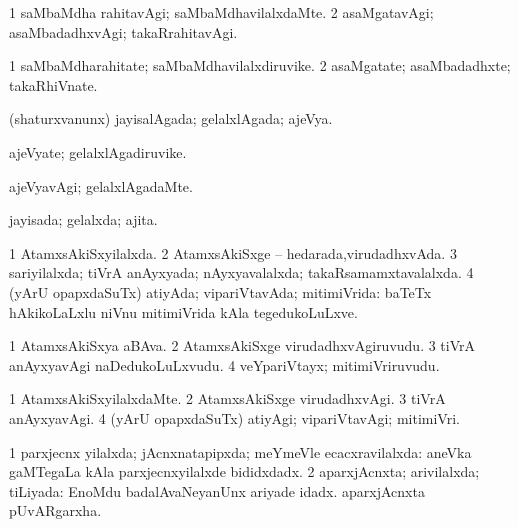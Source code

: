 \bentry
{} 
\gl{\kirxvi}
\expl{}
\bmng
\bnum
\num{1} saMbaMdha rahitavAgi; saMbaMdhavilalxdaMte. 
\num{2} asaMgatavAgi; asaMbadadhxvAgi; takaRrahitavAgi. 
\enum
\emng
\eentry


\bentry
{} 
\gl{\nA}
\expl{}
\bmng
\bnum
\num{1} saMbaMdharahitate; saMbaMdhavilalxdiruvike. 
\num{2} asaMgatate; asaMbadadhxte; takaRhiVnate. 
\enum
\emng
\eentry

\bentry
{} 
\gl{\gu}
\expl{}
\bmng
 (shaturxvanunx) jayisalAgada; gelalxlAgada; ajeVya. 
\emng
\eentry

\bentry
{} 
\gl{\nA}
\expl{}
\bmng
 ajeVyate; gelalxlAgadiruvike. 
\emng
\eentry

\bentry
{} 
\gl{\kirxvi}
\expl{}
\bmng
 ajeVyavAgi; gelalxlAgadaMte. 
\emng
\eentry

\bentry
{} 
\gl{\gu}
\expl{}
\bmng
 jayisada; gelalxda; ajita. 
\emng
\eentry

\bentry
{} 
\gl{\gu}
\expl{}
\bmng
\bnum
\num{1} AtamxsAkiSxyilalxda. 
\num{2} AtamxsAkiSxge -- hedarada,virudadhxvAda. 
\num{3} sariyilalxda; tiVrA anAyxyada; nAyxyavalalxda; takaRsamamxtavalalxda. 
\num{4} (yArU opapxdaSuTx) atiyAda; vipariVtavAda; mitimiVrida:  baTeTx hAkikoLaLxlu niVnu mitimiVrida kAla tegedukoLuLxve. 
\enum
\emng
\eentry

\bentry
{}
\gl{\nA}
\expl{}
\bmng
\bnum
\num{1} AtamxsAkiSxya aBAva. 
\num{2} AtamxsAkiSxge virudadhxvAgiruvudu. 
\num{3} tiVrA anAyxyavAgi naDedukoLuLxvudu. 
\num{4} veYpariVtayx; mitimiVriruvudu. 
\enum
\emng
\eentry

\bentry
{} 
\gl{\kirxvi}
\expl{}
\bmng
\bnum
\num{1} AtamxsAkiSxyilalxdaMte. 
\num{2} AtamxsAkiSxge virudadhxvAgi. 
\num{3} tiVrA anAyxyavAgi. 
\num{4} (yArU opapxdaSuTx) atiyAgi; vipariVtavAgi; mitimiVri. 
\enum
\emng
\eentry

\bentry
{} 
\gl{\gu}
\expl{}
\bmng
\bnum
\num{1} parxjecnx yilalxda; jAcnxnatapipxda; meYmeVle ecacxravilalxda:  aneVka gaMTegaLa kAla parxjecnxyilalxde bididxdadx. 
\num{2} aparxjAcnxta; arivilalxda; tiLiyada:  EnoMdu badalAvaNeyanUnx ariyade idadx.  aparxjAcnxta pUvARgarxha. 
\enum
\emng

